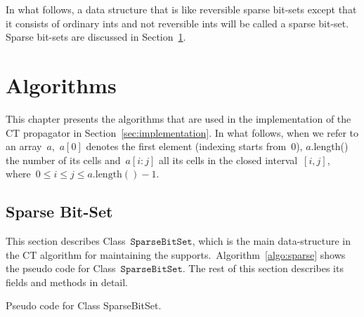 \documentclass[a4paper,11pt]{article}
\newcommand{\Secref}[1]{Section~\ref{#1}}
\newcommand{\Chapref}[1]{Section~\ref{#1}}
\newcommand{\Algoref}[1]{Algorithm~\ref{#1}}
\newcommand{\SparseBitSet}{\texttt{SparseBitSet}}
\newcommand{\function}[1]{\mathrm{#1}}
\numberwithin{equation}{section}
\begin{document}
In what follows, a data structure that is 
like reversible sparse bit-sets except that it consists 
of ordinary ints and not reversible ints
will be called a sparse bit-set. Sparse bit-sets are discussed
in \Secref{sec:algorithms}.


\section{Algorithms}
\label{sec:algorithms}


This chapter presents the algorithms that are used in the implementation of the
CT propagator in \Chapref{sec:implementation}. In what follows, when we refer to
an array~$a$,~$a[0]$ denotes the first element (indexing starts from~$0$),
$a$.length() the number of its cells and~$a[i:j]$ all its cells in the closed
interval~$[i,j]$, where~$0 \leq i \leq j \leq a.\function{length}() - 1$.

\subsection{Sparse Bit-Set}
\label{sec:sbs}
This section describes Class~$\SparseBitSet$, which is the main data-structure
in the CT algorithm for maintaining the supports.~\Algoref{algo:sparse} shows the
pseudo code for Class~$\SparseBitSet$. The rest of this section describes its
fields and methods in detail.

\begin{algorithm}[H]
  \begin{algorithmic}[1]  %
    
    \end{algorithmic}
  \caption{Pseudo code for Class SparseBitSet.}
  \label{algo:sparse}
\end{algorithm}
\end{document}
